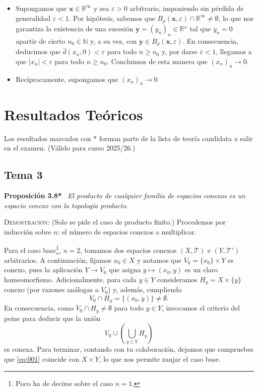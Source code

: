 \documentclass[11pt]{article}
\begin{document}
\begin{itemize}
    \item[($\Longrightarrow$)] Supongamos que $\mathbf{x} \in \overline{\mathbb{R}^\infty}$ y sea $\varepsilon > 0$ arbitrario, imponiendo sin pérdida de generalidad $\varepsilon < 1$. Por hipótesis, sabemos que $B_{\bar{\rho}}(\mathbf{x}, \varepsilon) \cap \mathbb{R}^\infty \neq \emptyset$, lo que nos garantiza la existencia de una sucesión $\mathbf{y} = (y_n)_n \in \mathbb{R}^\omega$ tal que $y_n = 0$ apartir de cierto $n_0 \in \mathbb{N}$ y, a su vez, con $\mathbf{y} \in B_{\bar{\rho}}(\mathbf{x}, \varepsilon)$. En consecuencia, deducimos que $\bar{d}(x_n, 0) < \varepsilon$ para todo $n \geq n_0$ y, por darse $\varepsilon < 1$, llegamos a que $|x_n| < \varepsilon$ para todo $n \geq n_0$. Concluimos de esta manera que $(x_n)_n \to 0$.
    
    
    \item[($\Longleftarrow$)] Recíprocamente, supongamos que $(x_n)_n \to 0$
\end{itemize}

\newpage

\section{Resultados Teóricos}

Los resultados marcados con * forman parte de la lista de teoría candidata a salir en el examen. (Válido para curso 2025/26.)

\subsection{Tema 3}

\noindent\textbf{Proposición 3.8*} \, \textit{El producto de cualquier familia de espacios conexos es un espacio conexo con la topología producto.}

\medskip

\noindent\textsc{Demostración}: (Solo se pide el caso de producto finito.) Procedemos por inducción sobre $n$: el número de espacios conexos a multiplicar.

Para el caso base\footnote{Poco ha de decirse sobre el caso $n = 1$.}, $n = 2$, tomamos dos espacios conexos $(X, \mathcal{T})$ e $(Y, \mathcal{T}')$ arbitrarios. A continuación, fijamos $x_0 \in X$ y notamos que $V_0 = \{x_0\} \times Y$ es conexo, pues la aplicación $Y \to V_0$ que asigna $y \mapsto (x_0, y)$ es un claro homeomorfismo. Adicionalmente, para cada $y \in Y$ consideramos $H_y = X \times \{y\}$ conexo (por razones análogas a $V_0$) y, además, cumpliendo \[V_0 \cap H_y = \{(x_0, y)\} \neq \emptyset.\] En consecuencia, como $V_0 \cap H_y \neq \emptyset$ para todo $y \in Y$, invocamos el criterio del peine para deducir que la unión \begin{equation}
    V_0 \cup \left(\bigcup_{y \in Y} H_y\right)
    \label{eq:001}
\end{equation} es conexa. Para terminar, contando con tu colaboración, dejamos que compruebes que \eqref{eq:001} coincide con $X \times Y$, lo que nos permite zanjar el caso base.
\end{document}
